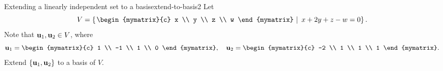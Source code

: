 \begin{example}{Extending a linearly independent set to a basis}{extend-to-basis2}
  Let
  \begin{equation*}
    V = \set{\left.
        \begin{mymatrix}{c} x \\ y \\ z \\ w \end{mymatrix}
        ~\right\vert~
      x+2y+z-w = 0
    }.
  \end{equation*}
  Note that $\vect{u}_1,\vect{u}_2\in V$, where
  \begin{equation*}
    \vect{u}_1 = \begin{mymatrix}{c} 1 \\ -1 \\ 1 \\ 0 \end{mymatrix},\quad
    \vect{u}_2 = \begin{mymatrix}{c} -2 \\ 1 \\ 1 \\ 1 \end{mymatrix}.
  \end{equation*}
  Extend $\set{\vect{u}_1,\vect{u}_2}$ to a basis of $V$.
\end{example}

